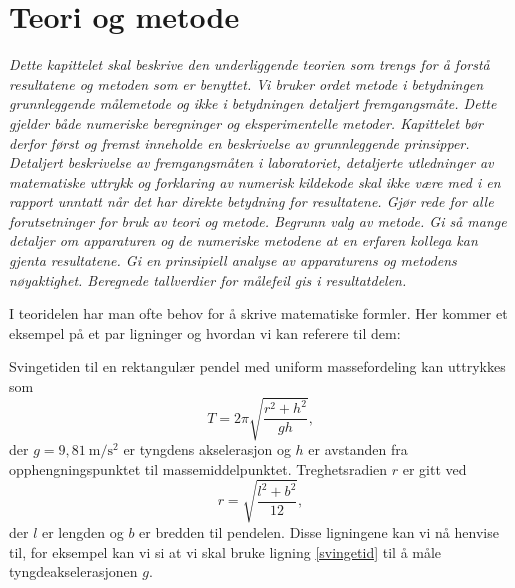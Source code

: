 \documentclass[5p]{elsarticle}
\newcommand{\enhet}[1]{~\mathrm{#1}}  %
\begin{document}
\section{Teori og metode}

\textit{Dette kapittelet skal beskrive den underliggende teorien som trengs for å forstå resultatene og metoden som er benyttet.
Vi bruker ordet metode i betydningen grunnleggende målemetode og ikke i betydningen detaljert fremgangsmåte. Dette gjelder
både numeriske beregninger og eksperimentelle metoder. Kapittelet bør derfor først og fremst inneholde en beskrivelse av
grunnleggende prinsipper. Detaljert beskrivelse av fremgangsmåten i laboratoriet, detaljerte utledninger av matematiske uttrykk
og forklaring av numerisk kildekode skal ikke være med i en rapport unntatt
når det har direkte betydning for resultatene.  Gjør rede for alle forutsetninger for bruk av teori og metode.
Begrunn valg av metode. Gi så mange detaljer om apparaturen og de numeriske metodene at en erfaren kollega kan gjenta
resultatene. Gi en prinsipiell analyse av apparaturens og metodens nøyaktighet. Beregnede tallverdier for målefeil
gis i resultatdelen.}

I teoridelen har man ofte behov for å skrive matematiske formler. Her kommer et eksempel på et par ligninger og hvordan vi kan referere til dem:

Svingetiden til en rektangulær pendel med uniform massefordeling kan uttrykkes som 
\begin{equation}
	T = 2\pi \sqrt { \frac{ r^2  + h^2 }{ gh } },
	\label{svingetid} %
\end{equation}
der $g=9,81\enhet{m/s^2}$ er tyngdens akselerasjon og $h$ er avstanden fra opphengningspunktet til massemiddelpunktet. Treghetsradien $r$ er gitt ved
\begin{equation}
	r = \sqrt {\frac{ l^2  + b^2 }{12} },
	\label{treghetsradius}
\end{equation}
der $l$ er lengden og $b$ er bredden til pendelen. Disse ligningene kan vi nå henvise til, for
eksempel kan vi si at vi skal bruke ligning \eqref{svingetid} til å måle tyngdeakselerasjonen $g$.

\end{document}
